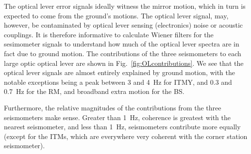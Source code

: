 The optical lever error signals ideally witness the mirror motion,
which in turn is expected to come from the ground's motions. The
optical lever signal, may, however, be contaminated by optical lever
sensing (electronics) noise or acoustic couplings. It is therefore
informative to calculate Wiener filters for the sesimometer signals to
understand how much of the optical lever spectra are in fact due to
ground motion. The contributions of the three seismometers to each
large optic optical lever are shown in
Fig.~\ref{fig:OLcontributions}. We see that the optical lever signals
are almost entirely explained by ground motion, with the notable
exceptions being a peak between 3 and 4~Hz for ITMY, and 0.3 and
0.7~Hz for the RM, and broadband extra motion for the BS.

Furthermore, the relative magnitudes of the contributions from the
three seismometers make sense. Greater than 1~Hz, coherence is
greatest with the nearest seismometer, and less than 1~Hz,
seismometers contribute more equally (except for the ITMs, which are
everywhere very coherent with the corner station seismometer).

